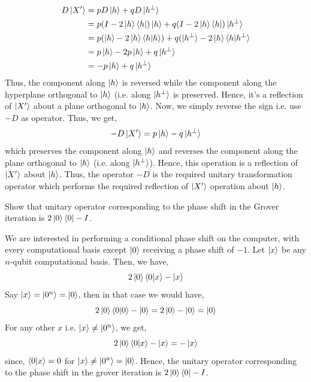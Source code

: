\begin{align*}
D\ket{X'}&=pD\ket{h}+qD\ket{h^{\perp}}\\
&=p(I-2\ket{h}\bra{h})\ket{h}+q(I-2\ket{h}\bra{h})\ket{h^{\perp}}\\
&=p(\ket{h}-2\ket{h}\braket{h|h})+q(\ket{h^{\perp}}-2\ket{h}\braket{h|h^{\perp}}\\
&=p\ket{h}-2p\ket{h}+q\ket{h^{\perp}}\\
&=-p\ket{h}+q\ket{h^{\perp}}\\
\end{align*}
Thus, the component along $\ket{h}$ is reversed while the component along the hyperplane orthogonal to $\ket{h}$ (i.e. along $\ket{h^{\perp}}$ is preserved. Hence, it's a reflection of $\ket{X'}$ about a plane orthogonal to $\ket{h}$. Now, we simply reverse the sign i.e. use $-D$ as operator. Thus, we get,
\[
-D\ket{X'}=p\ket{h}-q\ket{h^{\perp}}
\]
which preserves the component along $\ket{h}$ and reverses the component along the plane orthogonal to $\ket{h}$ (i.e. along $\ket{h^{\perp}}$). Hence, this operation is a reflection of $\ket{X'}$ about $\ket{h}$. Thus, the operator $-D$ is the required unitary transformation operator which performs the required reflection of $\ket{X'}$ operation about $\ket{h}$.

\begin{example}
    Show that unitary operator corresponding to the phase shift in the Grover iteration is $2\ket{0}\bra{0}-I$.

    We are interested in performing a conditional phase shift on the computer, with every computational basis except $\ket{0}$ receiving a phase shift of $-1$. Let $\ket{x}$ be any $n$-qubit computational basis. Then, we have,
    \[
    2\ket{0}\braket{0|x} - \ket{x}
    \]
    Say $\ket{x}=\ket{0^n}=\ket{0}$, then in that case we would have,
    \[
    2\ket{0}\braket{0|0} - \ket{0}=2\ket{0}-\ket{0}=\ket{0}
    \]
    For any other $x$ i.e. $\ket{x}\neq \ket{0^n}$, we get,
    \[
    2\ket{0}\braket{0|x} - \ket{x} = -\ket{x}
    \]
   since, $\braket{0|x}=0$ for $\ket{x}\neq \ket{0^n}=\ket{0}$. Hence, the unitary operator corresponding to the phase shift in the grover iteration is $2\ket{0}\bra{0}-I$.
\end{example}

